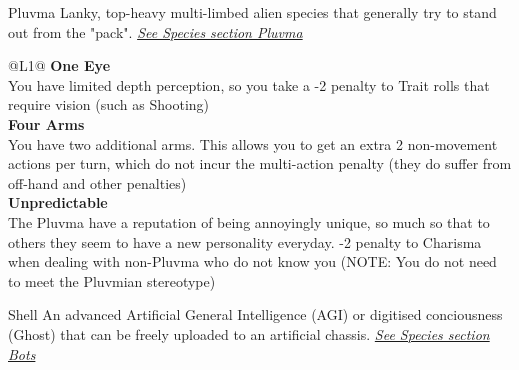 \begin{genericsection}{Pluvma}
  Lanky, top-heavy multi-limbed alien species that generally try to stand out from the "pack". \textit{\hyperref[sec:specie-pluvma]{See Species section Pluvma}}
\end{genericsection}
\begin{redtable}{\linewidth}{@{}L{1}@{}}
  \textbf{One Eye}\\
  You have limited depth perception, so you take a -2 penalty to Trait rolls that require vision (such as Shooting)\\
  \textbf{Four Arms}\\
  You have two additional arms. This allows you to get an extra 2 non-movement actions per turn, which do not incur the multi-action penalty (they do suffer from off-hand and other penalties)\\
  \textbf{Unpredictable}\\
  The Pluvma have a reputation of being annoyingly unique, so much so that to others they seem to have a new personality everyday. -2 penalty to Charisma when dealing with non-Pluvma who do not know you (NOTE: You do not need to meet the Pluvmian stereotype)\\
\end{redtable}

\vspace{\baselineskip}
  
\begin{genericsection}{Shell}
  An advanced Artificial General Intelligence (AGI) or digitised conciousness (Ghost) that can be freely uploaded to an artificial chassis. \textit{\hyperref[sec:specie-bots]{See Species section Bots}}
\end{genericsection}

\vspace{\baselineskip}

